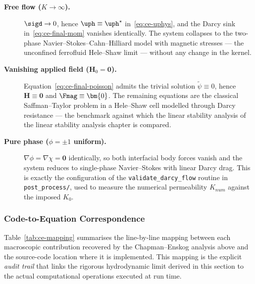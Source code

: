\begin{description}
    \item[\textbf{Free flow ($K\to\infty$).}] $\sigd \to 0$, hence $\uph \equiv \uph^{\star}$ in~\eqref{eq:ce-uphys}, and the Darcy sink in~\eqref{eq:ce-final-mom} vanishes identically.
    The system collapses to the two-phase Navier--Stokes--Cahn--Hilliard model with magnetic stresses --- the unconfined ferrofluid Hele--Shaw limit --- without any change in the kernel.
    \item[\textbf{Vanishing applied field ($\bm{H}_0 = \bm{0}$).}] Equation~\eqref{eq:ce-final-poisson} admits the trivial solution $\tilde{\psi} \equiv 0$, hence $\bm{H} \equiv \bm{0}$ and $\Fmag \equiv \bm{0}$.
    The remaining equations are the classical Saffman--Taylor problem in a Hele--Shaw cell modelled through Darcy resistance --- the benchmark against which the linear stability analysis of the linear stability analysis chapter is compared.
    \item[\textbf{Pure phase ($\phi = \pm 1$ uniform).}] $\nabla\phi = \nabla\chi = \bm{0}$ identically, so both interfacial body forces vanish and the system reduces to single-phase Navier--Stokes with linear Darcy drag.
    This is exactly the configuration of the \texttt{validate\_darcy\_flow} routine in \texttt{post\_process/}, used to measure the numerical permeability $K_{num}$ against the imposed $K_0$.
\end{description}

\subsubsection{Code-to-Equation Correspondence}\label{sec:ce-correspondence}

Table~\ref{tab:ce-mapping} summarises the line-by-line mapping between each macroscopic contribution recovered by the Chapman--Enskog analysis above and the source-code location where it is implemented.
This mapping is the explicit \emph{audit trail} that links the rigorous hydrodynamic limit derived in this section to the actual computational operations executed at run time.

